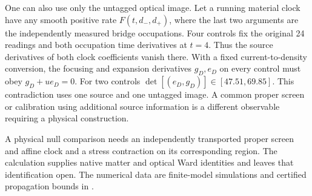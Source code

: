 One can also use only the untagged optical image. Let a running material
clock have any smooth positive rate $F(t,d_-,d_+)$, where the last two
arguments are the independently measured bridge occupations. Four controls
fix the original 24 readings and both occupation time derivatives at $t=4$.
Thus the source derivatives of both clock coefficients vanish there.
With a fixed current-to-density conversion, the focusing and expansion
derivatives $g_D,e_D$ on every control must obey $g_D+u e_D=0$.
For two controls $\det[(e_D,g_D)]\in[47.51,69.85]$. This contradiction
uses one source and one untagged image. A common proper screen or
calibration using additional source information is a different
observable requiring a physical construction.

A physical null comparison needs an independently transported proper
screen and affine clock and a stress contraction on its corresponding
region. The calculation supplies native matter and optical Ward
identities and leaves that identification open. The numerical data
are finite-model simulations and certified propagation bounds in
.
